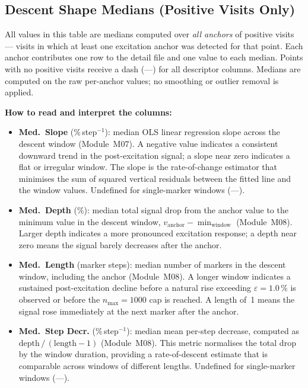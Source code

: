 \documentclass[a4paper,11pt]{article}
\begin{document}
\subsection{Descent Shape Medians (Positive Visits Only)}

All values in this table are medians computed over \emph{all anchors} of positive visits ---
visits in which at least one excitation anchor was detected for that point. Each anchor
contributes one row to the detail file and one value to each median. Points with no positive
visits receive a dash (---) for all descriptor columns.
Medians are computed on the raw per-anchor values; no smoothing or outlier removal is
applied.

\medskip
\noindent\textbf{How to read and interpret the columns:}

\begin{itemize}

  \item \textbf{Med.\ Slope} (\%\,step$^{-1}$): median OLS linear regression slope across
        the descent window (Module~M07). A negative value indicates a consistent downward
        trend in the post-excitation signal; a slope near zero indicates a flat or irregular
        window. The slope is the rate-of-change estimator that minimises the sum of squared
        vertical residuals between the fitted line and the window values. Undefined for
        single-marker windows (---).

  \item \textbf{Med.\ Depth} (\%): median total signal drop from the anchor value to the
        minimum value in the descent window,
        $v_{\mathrm{anchor}} - \min_{\mathrm{window}}$ (Module~M08). Larger depth indicates
        a more pronounced excitation response; a depth near zero means the signal barely
        decreases after the anchor.

  \item \textbf{Med.\ Length} (marker steps): median number of markers in the descent
        window, including the anchor (Module~M08). A longer window indicates a sustained
        post-excitation decline before a natural rise exceeding
        $\varepsilon = 1.0\,\%$ is observed or before the
        $n_{\max} = 1000$ cap is reached. A length of~1 means the signal rose
        immediately at the next marker after the anchor.

  \item \textbf{Med.\ Step Decr.} (\%\,step$^{-1}$): median mean per-step decrease,
        computed as $\mathrm{depth}\,/\,(\mathrm{length} - 1)$ (Module~M08). This metric
        normalises the total drop by the window duration, providing a rate-of-descent
        estimate that is comparable across windows of different lengths. Undefined for
        single-marker windows (---).

\end{itemize}
\end{document}
